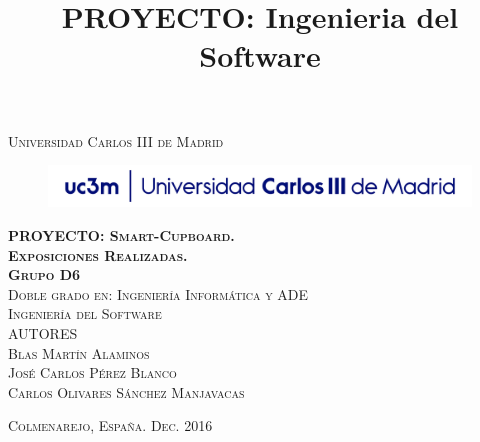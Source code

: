 \title{PROYECTO: Ingenieria del Software} %

\begin{titlingpage}
\begin{center}

\textsc{\Large Universidad Carlos III de Madrid}\\[4em]

\begin{figure}[h]
\begin{center}
\includegraphics[width=1\textwidth]{uc3m}
\end{center}
\end{figure}

\vspace{4em}

\textsc{\huge \textbf{PROYECTO: Smart-Cupboard.\\Exposiciones Realizadas.}}\\[4em]

\textsc{\large \textbf{Grupo D6}}\\[1em]

\textsc{Doble grado en: Ingeniería Informática y ADE}\\[1em]

\textsc{Ingeniería del Software}\\[16em]

\textsc{AUTORES}\\[1em]

\textsc{\Large Blas Martín Alaminos}\\[1em]
\textsc{\Large José Carlos Pérez Blanco}\\[1em]
\textsc{\Large Carlos Olivares Sánchez Manjavacas}\\[1em]


\end{center}

\vspace*{\fill}
\textsc{Colmenarejo, España. \hspace*{\fill} Dec. 2016}


\end{titlingpage}